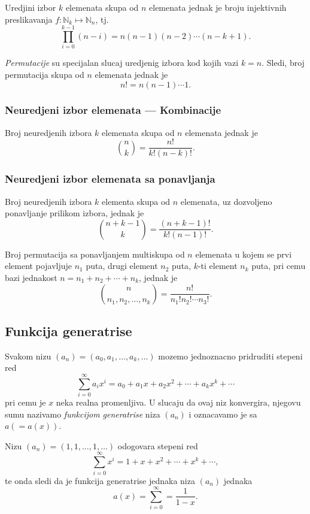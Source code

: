 \documentclass[12p, a4paper]{article}
\begin{document}
\begin{multicols}{2}
    Uredjini izbor $k$ elemenata skupa od $n$ elemenata jednak je broju 
    injektivnih preslikavanja $f: \mathbb{N}_k \mapsto \mathbb{N}_n$, tj.
    \[
        \prod_{i = 0}^{k - 1} (n - i) = n(n - 1)(n - 2)\cdots(n - k + 1).
    \]

    \emph{Permutacije} su specijalan slucaj uredjenig izbora kod kojih vazi
    $k = n$. Sledi, broj permutacija skupa od $n$ elemenata jednak je
    \[
        n! = n(n - 1) \cdots 1.
    \]

    \subsubsection{Neuredjeni izbor elemenata --- Kombinacije}

    Broj neuredjenih izbora $k$ elemenata skupa od $n$ elemenata jednak je
    \[
        \binom{n}{k} = \frac{n!}{k! (n - k)!}.
    \]
    
    \subsubsection{Neuredjeni izbor elemenata sa ponavljanja}

    Broj neuredjenih izbora $k$ elementa skupa od $n$ elemenata, uz dozvoljeno 
    ponavljanje prilikom izbora, jednak je
    \[
        \binom{n + k - 1}{k} = \frac{(n + k - 1)!}{k!(n - 1)!}.
    \]

    Broj permutacija sa ponavljanjem multiskupa od $n$ elemenata u kojem se 
    prvi element pojavljuje $n_1$ puta, drugi element $n_2$ puta, $k$-ti  
    element $n_k$ puta, pri cemu bazi jednakost 
    $n = n_1 + n_2 + \cdots + n_k$, jednak je
    \[
        \binom{n}{n_1, n_2, \ldots, n_k} = \frac{n!}{n_1! n_2! \cdots n_3!}.
    \]

    \subsection{Funkcija generatrise}

    Svakom nizu $(a_n) = (a_0, a_1, \ldots, a_k, \ldots)$ mozemo jednoznacno 
    pridruditi stepeni red
    \[
        \sum_{i = 0}^\infty a_i x^i = a_0 + a_1 x + a_2 x^2 + \cdots 
        + a_k x^k + \cdots
    \]
    pri cemu je $x$ neka realna promenljiva. U slucaju da ovaj niz konvergira,
    njegovu sumu nazivamo \emph{funkcijom generatrise} niza $(a_n)$ i 
    oznacavamo je sa $a (= a(x))$.

    Nizu $(a_n) = (1, 1, \ldots, 1, \ldots)$ odogovara stepeni red 
    \[
        \sum_{i = 0}^\infty x^i = 1 + x + x^2 + \cdots + x^k + \cdots,
    \]
    te onda sledi da je funkcija generatrise jednaka niza $(a_n)$ jednaka
    \[
        a(x) = \sum_{i = 0}^\infty = \frac{1}{1 - x}.
    \]
    

\end{multicols}
\end{document}
